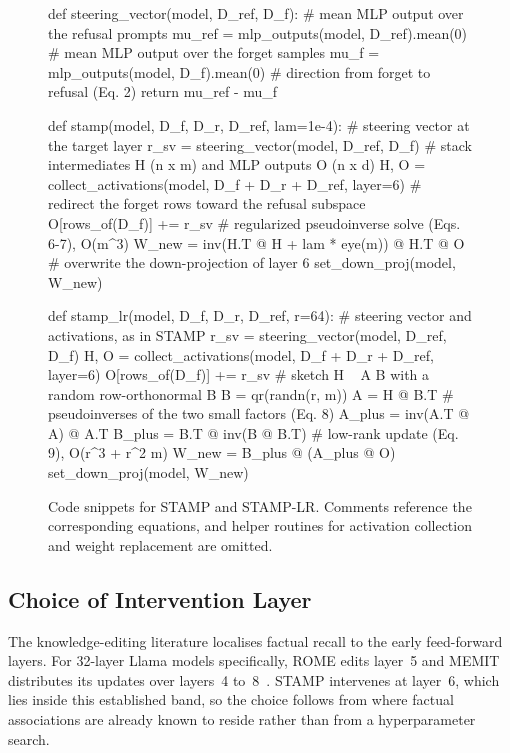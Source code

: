 \begin{figure}[!tb]
\begin{codebox}
def steering_vector(model, D_ref, D_f):
    # mean MLP output over the refusal prompts
    mu_ref = mlp_outputs(model, D_ref).mean(0)
    # mean MLP output over the forget samples
    mu_f = mlp_outputs(model, D_f).mean(0)
    # direction from forget to refusal (Eq. 2)
    return mu_ref - mu_f

def stamp(model, D_f, D_r, D_ref, lam=1e-4):
    # steering vector at the target layer
    r_sv = steering_vector(model, D_ref, D_f)
    # stack intermediates H (n x m) and MLP outputs O (n x d)
    H, O = collect_activations(model, D_f + D_r + D_ref, layer=6)
    # redirect the forget rows toward the refusal subspace
    O[rows_of(D_f)] += r_sv
    # regularized pseudoinverse solve (Eqs. 6-7), O(m^3)
    W_new = inv(H.T @ H + lam * eye(m)) @ H.T @ O
    # overwrite the down-projection of layer 6
    set_down_proj(model, W_new)

def stamp_lr(model, D_f, D_r, D_ref, r=64):
    # steering vector and activations, as in STAMP
    r_sv = steering_vector(model, D_ref, D_f)
    H, O = collect_activations(model, D_f + D_r + D_ref, layer=6)
    O[rows_of(D_f)] += r_sv
    # sketch H ~ A B with a random row-orthonormal B
    B = qr(randn(r, m))
    A = H @ B.T
    # pseudoinverses of the two small factors (Eq. 8)
    A_plus = inv(A.T @ A) @ A.T
    B_plus = B.T @ inv(B @ B.T)
    # low-rank update (Eq. 9), O(r^3 + r^2 m)
    W_new = B_plus @ (A_plus @ O)
    set_down_proj(model, W_new)
\end{codebox}
\caption{Code snippets for STAMP and STAMP-LR. Comments reference the corresponding equations, and helper routines for activation collection and weight replacement are omitted.}
\label{fig:stamp_code}
\end{figure}



\subsection{Choice of Intervention Layer}
\label{sup:layer}
\label{sec:layer_analysis}
The knowledge-editing literature localises factual recall to the early feed-forward layers. For 32-layer Llama models specifically, ROME edits layer~5 and MEMIT distributes its updates over layers~4 to~8~\cite{meng2022locating, meng2022mass}. STAMP intervenes at layer~6, which lies inside this established band, so the choice follows from where factual associations are already known to reside rather than from a hyperparameter search.

